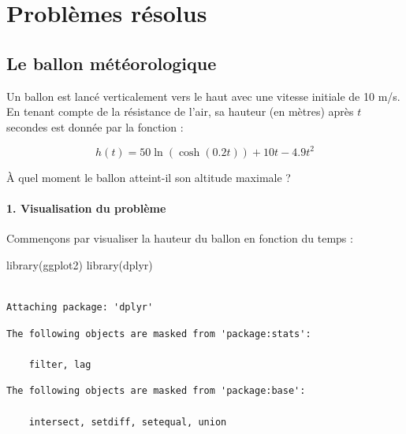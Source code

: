 \documentclass[
  12pt,
  letterpaper,
]{book}
\newenvironment{Shaded}{}{}
\newcommand{\FunctionTok}[1]{\textcolor[rgb]{0.44,0.26,0.76}{#1}}
\newcommand{\NormalTok}[1]{\textcolor[rgb]{0.14,0.16,0.18}{#1}}
\theoremstyle{remark}
\begin{document}
\part{Problèmes résolus}

\hypertarget{le-ballon-muxe9tuxe9orologique}{%
\chapter{Le ballon
météorologique}\label{le-ballon-muxe9tuxe9orologique}}

Un ballon est lancé verticalement vers le haut avec une vitesse initiale
de 10 m/s. En tenant compte de la résistance de l'air, sa hauteur (en
mètres) après \(t\) secondes est donnée par la fonction :

\[h(t) = 50\ln(\cosh(0.2t)) + 10t - 4.9t^2\]

À quel moment le ballon atteint-il son altitude maximale ?

\hypertarget{visualisation-du-probluxe8me}{%
\subsection{1. Visualisation du
problème}\label{visualisation-du-probluxe8me}}

Commençons par visualiser la hauteur du ballon en fonction du temps :

\begin{Shaded}
\begin{Highlighting}[]
\FunctionTok{library}\NormalTok{(ggplot2)}
\FunctionTok{library}\NormalTok{(dplyr)}
\end{Highlighting}
\end{Shaded}

\begin{verbatim}

Attaching package: 'dplyr'
\end{verbatim}

\begin{verbatim}
The following objects are masked from 'package:stats':

    filter, lag
\end{verbatim}

\begin{verbatim}
The following objects are masked from 'package:base':

    intersect, setdiff, setequal, union
\end{verbatim}
\end{document}
